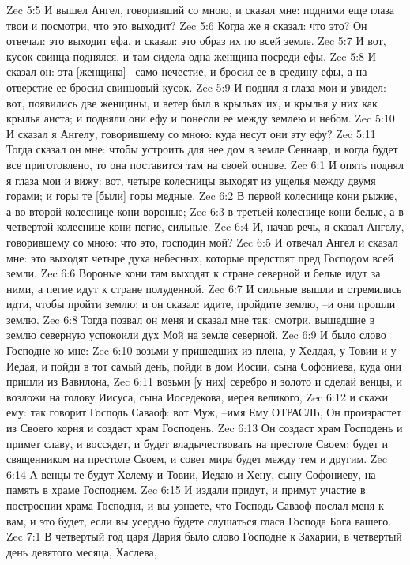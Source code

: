 Zec 5:5  И вышел Ангел, говоривший со мною, и сказал мне: подними еще глаза твои и посмотри, что это выходит?
Zec 5:6  Когда же я сказал: что это? Он отвечал: это выходит ефа, и сказал: это образ их по всей земле.
Zec 5:7  И вот, кусок свинца поднялся, и там сидела одна женщина посреди ефы.
Zec 5:8  И сказал он: эта [женщина] --само нечестие, и бросил ее в средину ефы, а на отверстие ее бросил свинцовый кусок.
Zec 5:9  И поднял я глаза мои и увидел: вот, появились две женщины, и ветер был в крыльях их, и крылья у них как крылья аиста; и подняли они ефу и понесли ее между землею и небом.
Zec 5:10  И сказал я Ангелу, говорившему со мною: куда несут они эту ефу?
Zec 5:11  Тогда сказал он мне: чтобы устроить для нее дом в земле Сеннаар, и когда будет все приготовлено, то она поставится там на своей основе.
Zec 6:1  И опять поднял я глаза мои и вижу: вот, четыре колесницы выходят из ущелья между двумя горами; и горы те [были] горы медные.
Zec 6:2  В первой колеснице кони рыжие, а во второй колеснице кони вороные;
Zec 6:3  в третьей колеснице кони белые, а в четвертой колеснице кони пегие, сильные.
Zec 6:4  И, начав речь, я сказал Ангелу, говорившему со мною: что это, господин мой?
Zec 6:5  И отвечал Ангел и сказал мне: это выходят четыре духа небесных, которые предстоят пред Господом всей земли.
Zec 6:6  Вороные кони там выходят к стране северной и белые идут за ними, а пегие идут к стране полуденной.
Zec 6:7  И сильные вышли и стремились идти, чтобы пройти землю; и он сказал: идите, пройдите землю, --и они прошли землю.
Zec 6:8  Тогда позвал он меня и сказал мне так: смотри, вышедшие в землю северную успокоили дух Мой на земле северной.
Zec 6:9  И было слово Господне ко мне:
Zec 6:10  возьми у пришедших из плена, у Хелдая, у Товии и у Иедая, и пойди в тот самый день, пойди в дом Иосии, сына Софониева, куда они пришли из Вавилона,
Zec 6:11  возьми [у них] серебро и золото и сделай венцы, и возложи на голову Иисуса, сына Иоседекова, иерея великого,
Zec 6:12  и скажи ему: так говорит Господь Саваоф: вот Муж, --имя Ему ОТРАСЛЬ, Он произрастет из Своего корня и создаст храм Господень.
Zec 6:13  Он создаст храм Господень и примет славу, и воссядет, и будет владычествовать на престоле Своем; будет и священником на престоле Своем, и совет мира будет между тем и другим.
Zec 6:14  А венцы те будут Хелему и Товии, Иедаю и Хену, сыну Софониеву, на память в храме Господнем.
Zec 6:15  И издали придут, и примут участие в построении храма Господня, и вы узнаете, что Господь Саваоф послал меня к вам, и это будет, если вы усердно будете слушаться гласа Господа Бога вашего.
Zec 7:1  В четвертый год царя Дария было слово Господне к Захарии, в четвертый день девятого месяца, Хаслева,
